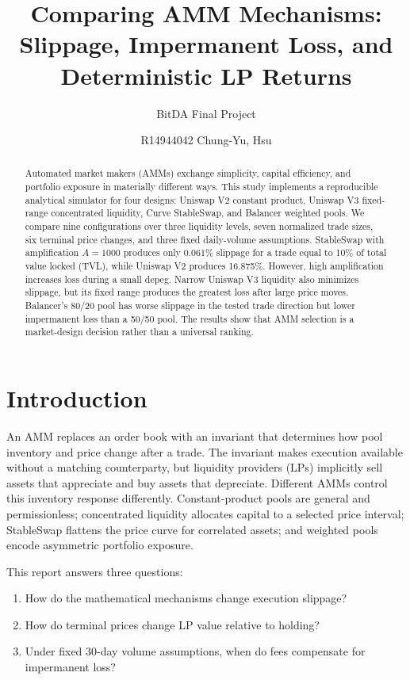 \documentclass[11pt,twocolumn]{article}
\title{\vspace{-1.2cm}\textbf{Comparing AMM Mechanisms:}\\
Slippage, Impermanent Loss, and Deterministic LP Returns}
\author{BitDA Final Project}
\date{R14944042 Chung-Yu, Hsu}
\newcommand{\pct}[1]{#1\%}
\begin{document}
\maketitle

\begin{abstract}
Automated market makers (AMMs) exchange simplicity, capital efficiency, and
portfolio exposure in materially different ways. This study implements a
reproducible analytical simulator for four designs: Uniswap V2 constant
product, Uniswap V3 fixed-range concentrated liquidity, Curve StableSwap, and
Balancer weighted pools. We compare nine configurations over three liquidity
levels, seven normalized trade sizes, six terminal price changes, and three
fixed daily-volume assumptions. StableSwap with amplification $A=1000$
produces only \pct{0.061} slippage for a trade equal to \pct{10} of total value
locked (TVL), while Uniswap V2 produces \pct{16.875}. However, high
amplification increases loss during a small depeg. Narrow Uniswap V3 liquidity
also minimizes slippage, but its fixed range produces the greatest loss after
large price moves. Balancer's 80/20 pool has worse slippage in the tested trade
direction but lower impermanent loss than a 50/50 pool. The results show that
AMM selection is a market-design decision rather than a universal ranking.
\end{abstract}

\section{Introduction}

An AMM replaces an order book with an invariant that determines how pool
inventory and price change after a trade. The invariant makes execution
available without a matching counterparty, but liquidity providers (LPs)
implicitly sell assets that appreciate and buy assets that depreciate.
Different AMMs control this inventory response differently. Constant-product
pools are general and permissionless; concentrated liquidity allocates capital
to a selected price interval; StableSwap flattens the price curve for
correlated assets; and weighted pools encode asymmetric portfolio exposure.

This report answers three questions:
\begin{enumerate}
  \item How do the mathematical mechanisms change execution slippage?
  \item How do terminal prices change LP value relative to holding?
  \item Under fixed 30-day volume assumptions, when do fees compensate for
  impermanent loss?
\end{enumerate}
\end{document}
